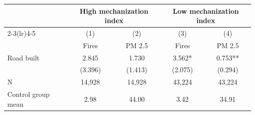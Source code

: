 {
\def\sym#1{\ifmmode^{#1}\else\(^{#1}\)\fi}
\begin{tabular}{l*{4}{c}}
\hline\hline
                         &\multicolumn{2}{c}{High mechanization index}&\multicolumn{2}{c}{Low mechanization index}\\\cmidrule(lr){2-3}\cmidrule(lr){4-5}
                         &\multicolumn{1}{c}{(1)}&\multicolumn{1}{c}{(2)}&\multicolumn{1}{c}{(3)}&\multicolumn{1}{c}{(4)}\\
                         &\multicolumn{1}{c}{Fires}&\multicolumn{1}{c}{PM 2.5}&\multicolumn{1}{c}{Fires}&\multicolumn{1}{c}{PM 2.5}\\
\hline
Road built               &       2.845   &       1.730   &       3.562*  &       0.753** \\
                         &     (3.396)   &     (1.413)   &     (2.075)   &     (0.294)   \\
\hline
N                        &      14,928   &      14,928   &      43,224   &      43,224   \\
Control group mean       &        2.98   &       44.00   &        3.42   &       34.91   \\
\hline\hline
\end{tabular}
}
